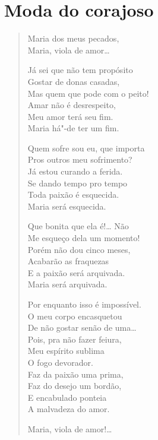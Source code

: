\chapter{Moda do corajoso}



\begin{verse}
Maria dos meus pecados,\\
Maria, viola de amor\ldots{}

Já sei que não tem propósito\\
Gostar de donas casadas,\\
Mas quem que pode com o peito!\\
Amar não é desrespeito,\\
Meu amor terá seu fim.\\
Maria há"-de ter um fim.

Quem sofre sou eu, que importa\\
Pros outros meu sofrimento?\\
Já estou curando a ferida.\\
Se dando tempo pro tempo\\
Toda paixão é esquecida.\\
Maria será esquecida.

Que bonita que ela é!\ldots{} Não\\
Me esqueço dela um momento!\\
Porém não dou cinco meses,\\
Acabarão as fraquezas\\
E a paixão será arquivada.\\
Maria será arquivada.

Por enquanto isso é impossível.\\
O meu corpo encasquetou\\
De não gostar senão de uma\ldots{}\\
Pois, pra não fazer feiura,\\
Meu espírito sublima\\
O fogo devorador.\\
Faz da paixão uma prima,\\
Faz do desejo um bordão,\\
E encabulado ponteia\\
A malvadeza do amor.

Maria, viola de amor!\ldots{}
\end{verse}

